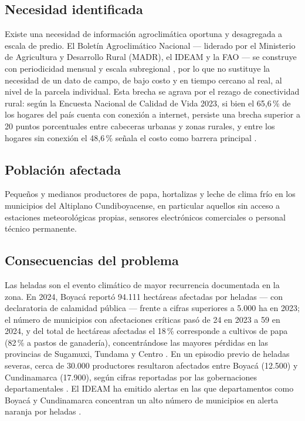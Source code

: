 \documentclass[11pt,a4paper]{article}
\begin{document}
\subsection{Necesidad identificada}
Existe una necesidad de información agroclimática oportuna y desagregada a escala de predio. El Boletín Agroclimático Nacional --- liderado por el Ministerio de Agricultura y Desarrollo Rural (MADR), el IDEAM y la FAO --- se construye con periodicidad mensual y escala subregional \citep{ideam_ban}, por lo que no sustituye la necesidad de un dato de campo, de bajo costo y en tiempo cercano al real, al nivel de la parcela individual. Esta brecha se agrava por el rezago de conectividad rural: según la Encuesta Nacional de Calidad de Vida 2023, si bien el 65{,}6\,\% de los hogares del país cuenta con conexión a internet, persiste una brecha superior a 20 puntos porcentuales entre cabeceras urbanas y zonas rurales, y entre los hogares sin conexión el 48{,}6\,\% señala el costo como barrera principal \citep{mintic2023}.

\subsection{Población afectada}
Pequeños y medianos productores de papa, hortalizas y leche de clima frío en los municipios del Altiplano Cundiboyacense, en particular aquellos sin acceso a estaciones meteorológicas propias, sensores electrónicos comerciales o personal técnico permanente.

\subsection{Consecuencias del problema}
Las heladas son el evento climático de mayor recurrencia documentada en la zona. En 2024, Boyacá reportó 94.111 hectáreas afectadas por heladas --- con declaratoria de calamidad pública --- frente a cifras superiores a 5.000 ha en 2023; el número de municipios con afectaciones críticas pasó de 24 en 2023 a 59 en 2024, y del total de hectáreas afectadas el 18\,\% corresponde a cultivos de papa (82\,\% a pastos de ganadería), concentrándose las mayores pérdidas en las provincias de Sugamuxi, Tundama y Centro \citep{boyaca7dias2026}. En un episodio previo de heladas severas, cerca de 30.000 productores resultaron afectados entre Boyacá (12.500) y Cundinamarca (17.900), según cifras reportadas por las gobernaciones departamentales \citep{semana2020}. El IDEAM ha emitido alertas en las que departamentos como Boyacá y Cundinamarca concentran un alto número de municipios en alerta naranja por heladas \citep{elpais_ideam}.
\end{document}
